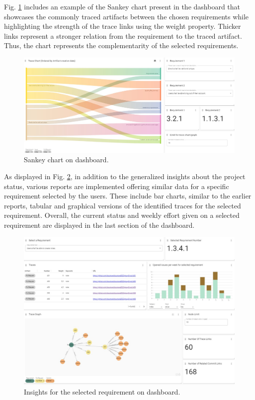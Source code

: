 Fig. \ref{fig:sankey} includes an example of the Sankey chart present in the dashboard that showcases the commonly traced artifacts between the chosen requirements while highlighting the strength of the trace links using the weight property. Thicker links represent a stronger relation from the requirement to the traced artifact. Thus, the chart represents the complementarity of the selected requirements.

\begin{figure}[htb]
    \centering
    \includegraphics[width=1\linewidth]{figs/sankey.jpg}
    \caption{Sankey chart on dashboard.}
    \label{fig:sankey}
\end{figure}

As displayed in Fig. \ref{fig:perreq}, in addition to the generalized insights about the project status, various reports are implemented offering similar data for a specific requirement selected by the users. These include bar charts, similar to the earlier reports, tabular and graphical versions of the identified traces for the selected requirement. Overall, the current status and weekly effort given on a selected requirement are displayed in the last section of the dashboard.

\begin{figure}[htb]
    \centering
    \includegraphics[width=1\linewidth]{figs/perreq.jpg}
    \caption{Insights for the selected requirement on dashboard.}
    \label{fig:perreq}
\end{figure}

